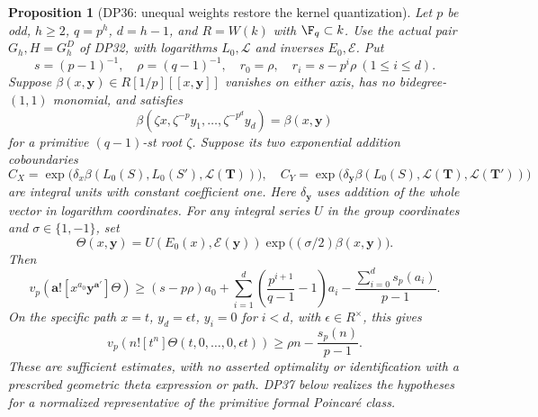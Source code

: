 \documentclass[11pt,a4paper]{article}
\newtheorem{proposition}[theorem]{Proposition}
\theoremstyle{definition}\newtheorem{remark}[theorem]{Remark}
\begin{document}
\begin{proposition}[DP36: unequal weights restore the kernel quantization]\label{DP36}
Let $p$ be odd, $h\ge2$, $q=p^h$, $d=h-1$, and $R=W(k)$ with $\F_q\subset k$. Use the actual pair $G_h,H=G_h^D$ of DP32, with logarithms $L_0,\mathcal L$ and inverses $E_0,\mathcal E$. Put
\[
 s=(p-1)^{-1},\quad\rho=(q-1)^{-1},\quad r_0=\rho,\quad r_i=s-p^i\rho\ (1\le i\le d).
\]
Suppose $\beta(x,\mathbf y)\in R[1/p][[x,\mathbf y]]$ vanishes on either axis, has no bidegree-$(1,1)$ monomial, and satisfies
\[
 \beta(\zeta x,\zeta^{-p}y_1,\ldots,\zeta^{-p^d}y_d)=\beta(x,\mathbf y)
\]
for a primitive $(q-1)$-st root $\zeta$. Suppose its two exponential addition coboundaries
\[
 C_X=\exp\bigl(\delta_x\beta(L_0(S),L_0(S'),\mathcal L(\mathbf T))\bigr),\quad
 C_Y=\exp\bigl(\delta_{\mathbf y}\beta(L_0(S),\mathcal L(\mathbf T),\mathcal L(\mathbf T'))\bigr)
\]
are integral units with constant coefficient one. Here $\delta_{\mathbf y}$ uses addition of the whole vector in logarithm coordinates. For any integral series $U$ in the group coordinates and $\sigma\in\{1,-1\}$, set
\[
 \Theta(x,\mathbf y)=U(E_0(x),\mathcal E(\mathbf y))\exp\bigl((\sigma/2)\beta(x,\mathbf y)\bigr).
\]
Then
\begin{equation}\label{eq:true-pair-weight}
 v_p(\mathbf a![x^{a_0}\mathbf y^{\mathbf a'}]\Theta)
 \ge (s-p\rho)a_0+\sum_{i=1}^d\left(\frac{p^{i+1}}{q-1}-1\right)a_i
       -\frac{\sum_{i=0}^d s_p(a_i)}{p-1}.
\end{equation}
On the specific path $x=t$, $y_d=\epsilon t$, $y_i=0$ for $i<d$, with $\epsilon\in R^\times$, this gives
\begin{equation}\label{eq:true-pair-path}
 v_p(n![t^n]\Theta(t,0,\ldots,0,\epsilon t))
 \ge\rho n-\frac{s_p(n)}{p-1}.
\end{equation}
These are sufficient estimates, with no asserted optimality or identification with a prescribed geometric theta expression or path. DP37 below realizes the hypotheses for a normalized representative of the primitive formal Poincar\'e class.
\end{proposition}
\end{document}
